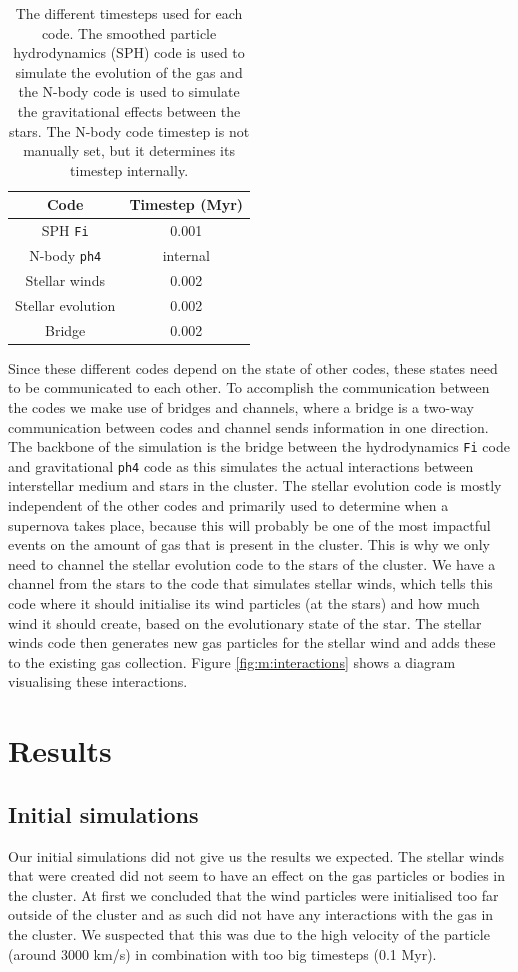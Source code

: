 \documentclass[12pt, twocolumn]{article}
\begin{document}
\begin{table}[h]
    \centering
    \begin{tabular}{c|c}
        Code & Timestep (\si{\mega yr})\\
        \hline
        SPH \texttt{Fi} &  0.001\\
        N-body \texttt{ph4} & internal\\
        Stellar winds & 0.002\\
        Stellar evolution & 0.002\\
        Bridge & 0.002
    \end{tabular}
    \caption{The different timesteps used for each code. The smoothed particle hydrodynamics (SPH) code is used to simulate the evolution of the gas and the N-body code is used to simulate the gravitational effects between the stars. The N-body code timestep is not manually set, but it determines its timestep internally.}
    \label{tab:timesteps}
\end{table}


Since these different codes depend on the state of other codes, these states need to be communicated to each other.
To accomplish the communication between the codes we make use of bridges and channels, where a bridge is a two-way communication between codes and channel sends information in one direction.
The backbone of the simulation is the bridge between the hydrodynamics \texttt{Fi} code and gravitational \texttt{ph4} code as this simulates the actual interactions between interstellar medium and stars in the cluster.
The stellar evolution code is mostly independent of the other codes and primarily used to determine when a supernova takes place, because this will probably be one of the most impactful events on the amount of gas that is present in the cluster.
This is why we only need to channel the stellar evolution code to the stars of the cluster.
We have a channel from the stars to the code that simulates stellar winds, which tells this code where it should initialise its wind particles (at the stars) and how much wind it should create, based on the evolutionary state of the star.
The stellar winds code then generates new gas particles for the stellar wind and adds these to the existing gas collection.
Figure \ref{fig:m:interactions} shows a diagram visualising these interactions.


\section{Results}
\subsection{Initial simulations}
Our initial simulations did not give us the results we expected.
The stellar winds that were created did not seem to have an effect on the gas particles or bodies in the cluster.
At first we concluded that the wind particles were initialised too far outside of the cluster and as such did not have any interactions with the gas in the cluster.
We suspected that this was due to the high velocity of the particle (around 3000 km/s) in combination with too big timesteps (0.1 Myr).
\end{document}
